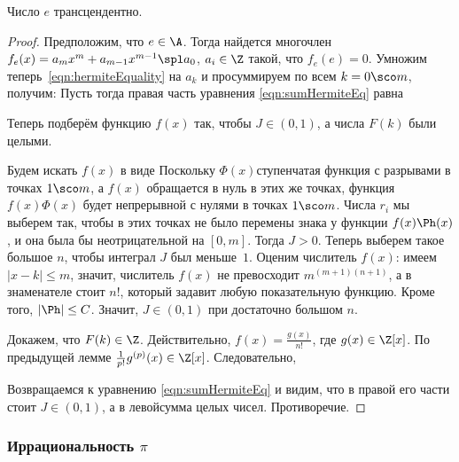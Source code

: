 \documentclass[a4paper]{article}
\def\dx{\,dx}
\begin{document}
\begin{theorem}[Эрмит, 1873~г.]
Число $e$ трансцендентно.
\end{theorem}
\begin{proof}
Предположим, что $e\in\A$. Тогда найдется многочлен
$f_e(x)=a_mx^m+a_{m-1}x^{m-1}\spl a_0$, $a_i\in\Z$ такой, что $f_e(e)=0$.
Умножим теперь~\eqref{eqn:hermiteEquality} на $a_k$ и просуммируем по всем
$k=0\sco m$, получим:
Пусть
тогда правая часть уравнения \eqref{eqn:sumHermiteEq} равна
\eqn{J:=\intl{0}{m}f(x)\Phi(x)e^{-x}\dx.}

Теперь подберём функцию $f(x)$ так, чтобы $J\in(0,1)$, а числа $F(k)$ были целыми.

Будем искать $f(x)$ в виде
Поскольку $\Phi(x)$\т ступенчатая функция с разрывами в точках $1\sco m$, а $f(x)$ обращается в нуль в этих же точках,
функция $f(x)\Phi(x)$ будет непрерывной с нулями в точках $1\sco m$.
Числа $r_i$ мы выберем так, чтобы в этих точках не было перемены знака у функции $f(x)\Ph(x)$,
и она была бы неотрицательной на $[0,m]$. Тогда $J>0$. Теперь выберем такое большое $n$, чтобы интеграл $J$ был меньше~$1$.
Оценим числитель $f(x)$: имеем $|x-k|\le m$, значит, числитель $f(x)$ не превосходит $m^{(m+1)(n+1)}$, а в знаменателе стоит $n!$,
который задавит любую показательную функцию. Кроме того, $|\Ph|\le C$. Значит, $J\in(0,1)$ при достаточно большом $n$.

Докажем, что $F(k)\in\Z$. Действительно, $f(x)=\frac{g(x)}{n!}$, где $g(x)\in\Z[x]$. По предыдущей лемме $\frac{1}{p!}g^{(p)}(x) \in\Z[x]$.
Следовательно,

Возвращаемся к уравнению \eqref{eqn:sumHermiteEq} и видим, что в правой его части стоит $J\in(0,1)$, а в левой\т сумма целых чисел.
Противоречие.
\end{proof}

\subsubsection{Иррациональность $\pi$}
\end{document}
